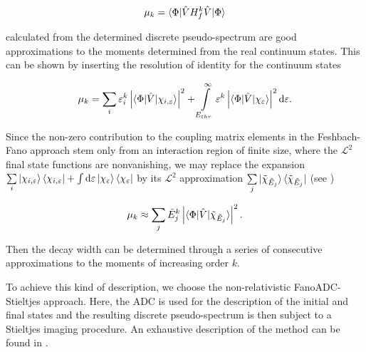 \begin{equation}
 \mu_k = \braket{ \Phi | \hat{V} H^k_f \hat{V} | \Phi }
\end{equation}

calculated from the determined
discrete pseudo-spectrum are good approximations to the moments determined
from the real continuum states.
This can be shown by inserting the resolution of identity for
the continuum states

\begin{equation}
 \mu_k = \sum_i \varepsilon_i^k
         \left| \braket{ \Phi | \hat{V} | \chi_{i,\varepsilon} } \right| ^2
       + \int\limits_{E_{thr}}^{\infty} \varepsilon^k
         \left| \braket{\Phi|\hat{V}|\chi_{\varepsilon}} \right|^2 \mathrm{d}\varepsilon  .
\end{equation}

Since the non-zero contribution to the coupling matrix elements in the
Feshbach-Fano approach stem only
from an interaction region of finite size, where the $\mathcal{L}^2$ final
state functions are nonvanishing, we may replace the expansion
$\sum\limits_i \ket{\chi_{i,\varepsilon}} \bra{\chi_{i,\varepsilon}}
 + \int \mathrm{d}\varepsilon \ket{\chi_\varepsilon} \bra{\chi_\varepsilon}$
by its $\mathcal{L}^2$ approximation
$\sum\limits_j \ket{\tilde{\chi}_{\tilde{E}_j}} \bra{\tilde{\chi}_{\tilde{E}_j}}$
(see \cite{Reinhardt79})

\begin{equation}
 \label{eq:moment_discrete}
 \mu_k \approx \sum\limits_j \tilde{E}_j ^k
         \left| \braket{\Phi|\hat{V}|\tilde{\chi}_{\tilde{E}_j}}  \right|^2 .
\end{equation}

Then the decay width can be determined through a series of
consecutive approximations to the moments of increasing order $k$.

To achieve this kind of description, we choose the non-relativistic
FanoADC-Stieltjes approach.
Here, the ADC is used for the description of the
initial and final states and the resulting discrete pseudo-spectrum
is then subject to a Stieltjes imaging procedure.
An exhaustive description of the method can be found in \cite{Fasshauer15,Fasshauer_thesis}.
